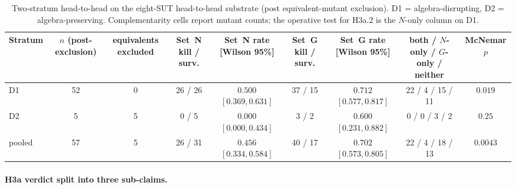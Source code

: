 \documentclass[acmsmall, screen]{acmart}
\begin{document}
\begin{table}[h]
\centering
\caption{Two-stratum head-to-head on the eight-SUT head-to-head
substrate (post equivalent-mutant exclusion). D1 = algebra-disrupting,
D2 = algebra-preserving. Complementarity cells report mutant counts;
the operative test for H3a.2 is the $N$-only column on D1.}
\label{tab:two-stratum}
\small
\begin{tabular}{lcccccccc}
\toprule
Stratum & $n$ (post-exclusion) & equivalents excluded & Set~N kill / surv. & Set~N rate \scriptsize{[Wilson 95\%]} & Set~G kill / surv. & Set~G rate \scriptsize{[Wilson 95\%]} & both / $N$-only / $G$-only / neither & McNemar $p$ \\
\midrule
D1 & 52 & 0 & 26 / 26 & $0.500$ \scriptsize{$[0.369, 0.631]$} & 37 / 15 & $0.712$ \scriptsize{$[0.577, 0.817]$} & 22 / 4 / 15 / 11 & $0.019$ \\
D2 & 5 & 5 & 0 / 5 & $0.000$ \scriptsize{$[0.000, 0.434]$} & 3 / 2 & $0.600$ \scriptsize{$[0.231, 0.882]$} & 0 / 0 / 3 / 2 & $0.25$ \\
\midrule
pooled & 57 & 5 & 26 / 31 & $0.456$ \scriptsize{$[0.334, 0.584]$} & 40 / 17 & $0.702$ \scriptsize{$[0.573, 0.805]$} & 22 / 4 / 18 / 13 & $0.0043$ \\
\bottomrule
\end{tabular}
\end{table}

\paragraph{H3a verdict split into three sub-claims.}
\label{para:h3a-verdict}
\end{document}
